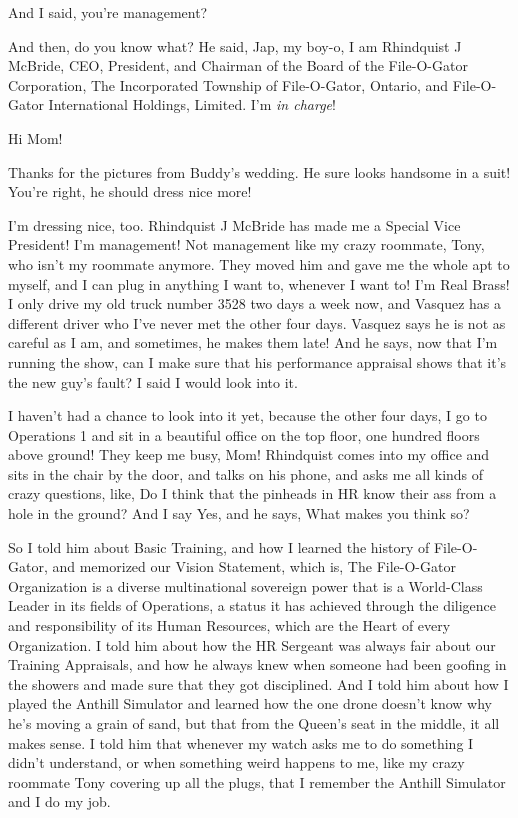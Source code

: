 And I said, you're management?

And then, do you know what? He said, Jap, my boy-o, I am Rhindquist J 
McBride, CEO, President, and Chairman of the Board of the File-O-Gator 
Corporation, The Incorporated Township of File-O-Gator, Ontario, and 
File-O-Gator International Holdings, Limited. I'm \emph{in charge}!

\tb

Hi Mom!

Thanks for the pictures from Buddy's wedding. He sure looks handsome in 
a suit! You're right, he should dress nice more!

I'm dressing nice, too. Rhindquist J McBride has made me a Special Vice 
President! I'm management! Not management like my crazy roommate, Tony, 
who isn't my roommate anymore. They moved him and gave me the whole apt 
to myself, and I can plug in anything I want to, whenever I want to! 
I'm Real Brass! I only drive my old truck number 3528 two days a week 
now, and Vasquez has a different driver who I've never met the other 
four days. Vasquez says he is not as careful as I am, and sometimes, he 
makes them late! And he says, now that I'm running the show, can I make 
sure that his performance appraisal shows that it's the new guy's 
fault? I said I would look into it.

I haven't had a chance to look into it yet, because the other four 
days, I go to Operations 1 and sit in a beautiful office on the top 
floor, one hundred floors above ground! They keep me busy, Mom! 
Rhindquist comes into my office and sits in the chair by the door, and 
talks on his phone, and asks me all kinds of crazy questions, like, Do 
I think that the pinheads in HR know their ass from a hole in the 
ground? And I say Yes, and he says, What makes you think so?

So I told him about Basic Training, and how I learned the history of 
File-O-Gator, and memorized our Vision Statement, which is, The 
File-O-Gator Organization is a diverse multinational sovereign power 
that is a World-Class Leader in its fields of Operations, a status it 
has achieved through the diligence and responsibility of its Human 
Resources, which are the Heart of every Organization. I told him about 
how the HR Sergeant was always fair about our Training Appraisals, and 
how he always knew when someone had been goofing in the showers and 
made sure that they got disciplined. And I told him about how I played 
the Anthill Simulator and learned how the one drone doesn't know why 
he's moving a grain of sand, but that from the Queen's seat in the 
middle, it all makes sense. I told him that whenever my watch asks me 
to do something I didn't understand, or when something weird happens to 
me, like my crazy roommate Tony covering up all the plugs, that I 
remember the Anthill Simulator and I do my job.

